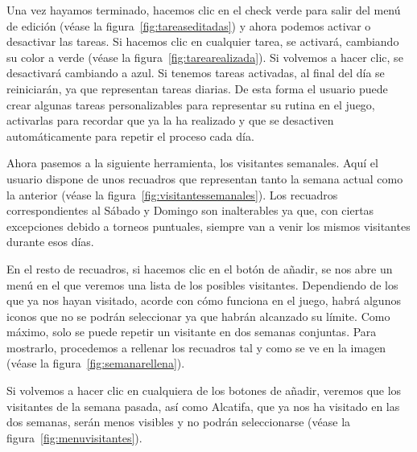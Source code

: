 Una vez hayamos terminado, hacemos clic en el check verde para salir del menú de edición {(v\'ease la figura~\ref{fig:tareaseditadas})} y ahora podemos activar o desactivar las tareas. Si hacemos clic en cualquier tarea, se activará, cambiando su color a verde {(v\'ease la figura~\ref{fig:tarearealizada})}. Si volvemos a hacer clic, se desactivará cambiando a azul. Si tenemos tareas activadas, al final del día se reiniciarán, ya que representan tareas diarias. De esta forma el usuario puede crear algunas tareas personalizables para representar su rutina en el juego, activarlas para recordar que ya la ha realizado y que se desactiven automáticamente para repetir el proceso cada día.\\


\clearpage

Ahora pasemos a la siguiente herramienta, los visitantes semanales. Aquí el usuario dispone de unos recuadros que representan tanto la semana actual como la anterior {(v\'ease la figura~\ref{fig:visitantessemanales})}. Los recuadros correspondientes al Sábado y Domingo son inalterables ya que, con ciertas excepciones debido a torneos puntuales, siempre van a venir los mismos visitantes durante esos días.\\


En el resto de recuadros, si hacemos clic en el botón de añadir, se nos abre un menú en el que veremos una lista de los posibles visitantes. Dependiendo de los que ya nos hayan visitado, acorde con cómo funciona en el juego, habrá algunos iconos que no se podrán seleccionar ya que habrán alcanzado su límite. Como máximo, solo se puede repetir un visitante en dos semanas conjuntas. Para mostrarlo, procedemos a rellenar los recuadros tal y como se ve en la imagen {(v\'ease la figura~\ref{fig:semanarellena})}.\\


\clearpage

Si volvemos a hacer clic en cualquiera de los botones de añadir, veremos que los visitantes de la semana pasada, así como Alcatifa, que ya nos ha visitado en las dos semanas, serán menos visibles y no podrán seleccionarse {(v\'ease la figura~\ref{fig:menuvisitantes})}.\\


